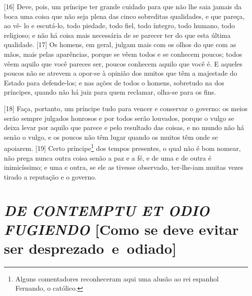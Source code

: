 {[}16{]} Deve, pois, um príncipe ter grande cuidado para que não lhe
saia jamais da boca uma coisa que não seja plena das cinco sobreditas
qualidades, e que pareça, ao vê- lo e escutá-lo, todo piedade, todo
fiel, todo íntegro, todo humano, todo religioso; e não há coisa mais
necessária de se parecer ter do que esta última qualidade. {[}17{]} Os
homens, em geral, julgam mais com os olhos do que com as mãos, mais
pelas aparências, porque se vêem todos e se conhecem poucos; todos vêem
aquilo que você pareces ser, poucos conhecem aquilo que você é. E
aqueles poucos não se atrevem a opor-se à opinião dos muitos que têm a
majestade do Estado para defende-los; e nas ações de todos o homens,
sobretudo na dos príncipes, quando não há juiz para quem reclamar,
olha-se para os fins.

{[}18{]} Faça, portanto, um príncipe tudo para vencer e conservar o
governo: os meios serão sempre julgados honrosos e por todos serão
louvados, porque o vulgo se deixa levar por aquilo que parece e pelo
resultado das coisas, e no mundo não há senão o vulgo, e os poucos não
têm lugar quando os muitos têm onde se apoiarem. {[}19{]} Certo
príncipe\footnote{Alguns comentadores reconheceram aqui uma alusão ao
  rei espanhol Fernando, o católico.} dos tempos presentes, o qual não é
bom nomear, não prega nunca outra coisa senão a paz e a fé, e de uma e
de outra é inimicíssimo; e uma e outra, se ele as tivesse observado,
ter-lhe-iam muitas vezes tirado a reputação e o governo.

\quebra\section{\emph{DE CONTEMPTU ET ODIO FUGIENDO}\break
{[}Como se deve evitar ser desprezado~e~odiado{]}}

